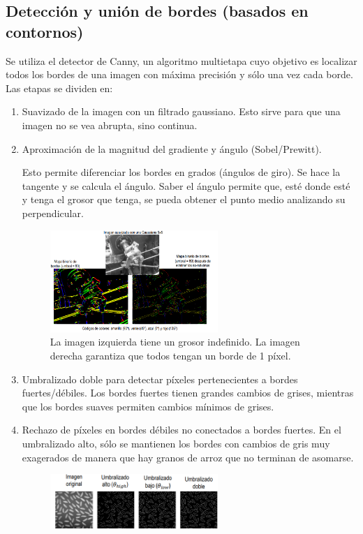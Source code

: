 \subsection{Detección y unión de bordes (basados en contornos)}
Se utiliza el detector de Canny, un algoritmo multietapa cuyo objetivo es localizar todos los bordes de una imagen con máxima precisión y sólo una vez cada borde. Las etapas se dividen en:
\begin{enumerate}
\item Suavizado de la imagen con un filtrado gaussiano. Esto sirve para que una imagen no se vea abrupta, sino continua.
\item Aproximación de la magnitud del gradiente y ángulo (Sobel/Prewitt).

Esto permite diferenciar los bordes en grados (ángulos de giro). Se hace la tangente y se calcula el ángulo. Saber el ángulo permite que, esté donde esté y tenga el grosor que tenga, se pueda obtener el punto medio analizando su perpendicular. 

\begin{figure}[h]
\centering
\includegraphics[width = 0.6\textwidth]{figs/deteccion-bordes.png}
\caption{La imagen izquierda tiene un grosor indefinido. La imagen derecha garantiza que todos tengan un borde de 1 píxel.}
\end{figure}

\item Umbralizado doble para detectar píxeles pertenecientes a bordes fuertes/débiles. Los bordes fuertes tienen grandes cambios de grises, mientras que los bordes suaves permiten cambios mínimos de grises.

\item Rechazo de píxeles en bordes débiles no conectados a bordes fuertes.
En el umbralizado alto, sólo se mantienen los bordes con cambios de gris muy exagerados de manera que hay granos de arroz que no terminan de asomarse.

\begin{figure}[h]
\centering
\includegraphics[width = 0.6\textwidth]{figs/bordes.png}
\end{figure} 
\end{enumerate}

